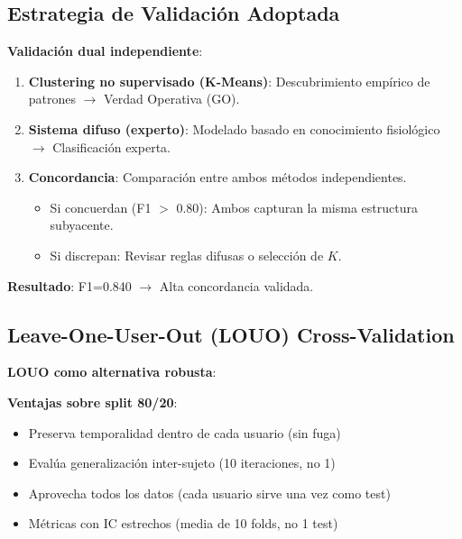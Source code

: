 \documentclass[12pt,letterpaper,twoside]{report}
\begin{document}
\begin{calculobox}
\subsection{Estrategia de Validación Adoptada}

\begin{decisionbox}
\textbf{Validación dual independiente}:

\begin{enumerate}[noitemsep]
    \item \textbf{Clustering no supervisado (K-Means)}: Descubrimiento empírico de patrones $\to$ Verdad Operativa (GO).
    
    \item \textbf{Sistema difuso (experto)}: Modelado basado en conocimiento fisiológico $\to$ Clasificación experta.
    
    \item \textbf{Concordancia}: Comparación entre ambos métodos independientes.
    \begin{itemize}[noitemsep]
        \item Si concuerdan (F1 $>$ 0.80): Ambos capturan la misma estructura subyacente.
        \item Si discrepan: Revisar reglas difusas o selección de $K$.
    \end{itemize}
\end{enumerate}

\textbf{Resultado}: F1=0.840 $\to$ Alta concordancia validada.
\end{decisionbox}

\subsection{Leave-One-User-Out (LOUO) Cross-Validation}

\begin{estadisticobox}
\textbf{LOUO como alternativa robusta}:

\textbf{Ventajas sobre split 80/20}:
\begin{itemize}[noitemsep]
    \item Preserva temporalidad dentro de cada usuario (sin fuga)
    \item Evalúa generalización inter-sujeto (10 iteraciones, no 1)
    \item Aprovecha todos los datos (cada usuario sirve una vez como test)
    \item Métricas con IC estrechos (media de 10 folds, no 1 test)
\end{itemize}


\end{estadisticobox}
\end{calculobox}
\end{document}
